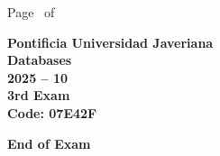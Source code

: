 \documentclass[11pt, addpoints]{exam}\usepackage[utf8]{inputenc}
\begin{document}
\begin{coverpages}
\begin{center}
			\vspace{3mm}
			\leavevmode \hspace{5mm} 
		\end{center}
	\end{coverpages}

	\footer{} {Page \thepage\ of \numpages} {}

	\centering
	\textbf{\Large Pontificia Universidad Javeriana}\\
	\textbf{\Large Databases} \\
	\textbf{\large 2025 -- 10} \\
	\textbf{\large 3rd Exam} \\
	\textbf{Code: 07E42F}


	\begin{questions}
		
		
		
		
		
		
		
		
		
		
		
		
		
		
		
		
		
		
		
		
	\end{questions}

	\vspace{5mm}
	\noindent \textbf{End of Exam}
\end{document}
